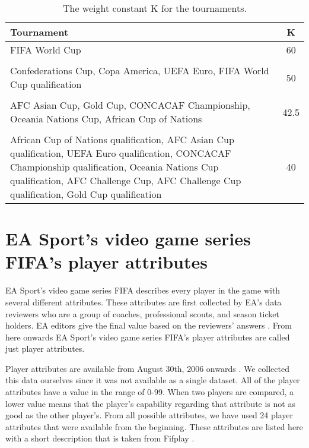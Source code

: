 \begin{table}
    \centering
    \caption{The weight constant $\mathrm { K }$ for the tournaments.}
    \label{table:weight_constant}
    \begin{tabular}{|L|c|}\hline
        \textbf{Tournament} & \textbf{K} \\\hline
        FIFA World Cup & 60 \\
        & \\
        Confederations Cup, Copa America, UEFA Euro, FIFA World Cup qualification & 50 \\
        & \\
        AFC Asian Cup, Gold Cup, CONCACAF Championship, Oceania Nations Cup, African Cup of Nations &42.5\\
        & \\
        African Cup of Nations qualification, AFC Asian Cup qualification, UEFA Euro qualification, CONCACAF Championship qualification, Oceania Nations Cup qualification, AFC Challenge Cup, AFC Challenge Cup qualification, Gold Cup qualification &  40 \\ \hline
    \end{tabular}
\end{table}

\section{EA Sport’s video game series FIFA's player attributes}
EA Sport's video game series FIFA describes every player in the game with several different attributes. These attributes are first collected by EA's data reviewers who are a group of coaches, professional scouts, and season ticket holders. EA editors give the final value based on the reviewers' answers \cite{playerattr}. From here onwards EA Sport's video game series FIFA's player attributes are called just player attributes.

Player attributes are available from August 30th, 2006 onwards \cite{sofifa}. We collected this data ourselves since it was not available as a single dataset.
All of the player attributes have a value in the range of 0-99. When two players are compared, a lower value means that the player's capability regarding that attribute is not as good as the other player's. From all possible attributes, we have used 24 player attributes that were available from the beginning. These attributes are listed here with a short description that is taken from Fifplay \cite{playerattr}.

